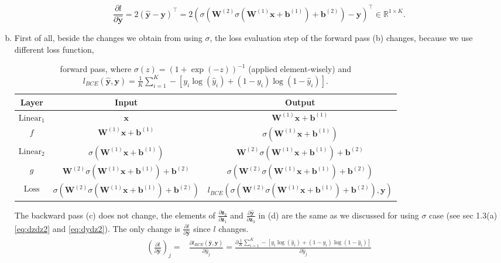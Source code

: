 \documentclass[10pt,a4paper]{article}
\theoremstyle{dotlessP}
\def\RR{\mathbb{R}}
\newcommand{\linear}{\text{Linear}}
\newcommand{\loss}{\text{Loss}}
\newcommand{\dldy}{\frac{\partial l}{\partial \bm{\hat{y}}}}
\newcommand{\dydz}{\frac{\partial \bm{\hat{y}}}{\partial \bm z_3}}
\newcommand{\dzdz}{\frac{\partial \bm z_2}{\partial \bm z_1}}
\newcommand{\yh}{\bm{\hat{y}}}
\begin{document}
\begin{enumerate}[(a)]
\begin{equation}
\dldy = 2(\yh -\bm y)^\top =2 \left(\sigma\left(\bm W^{(2)}\sigma\left(\bm W^{(1)} \bm x+\bm b^{(1)}\right) + \bm b^{(2)}\right)-\bm y\right)^\top\in \RR^{1\times K}.
\end{equation}
\item First of all, beside the changes we obtain from using $\sigma$,  the loss evaluation step of the forward pass (b) changes, because we use different loss function,
	\begin{table}[tbhp] 
	{\footnotesize
		\caption{ forward pass, where $\sigma(z)=(1+\exp(-z))^{-1}$ (applied element-wisely) and $l_{BCE}(\yh, \bm y)=\frac{1}{K}\sum_{i=1}^{K}-[y_i\log(\hat{y}_i)+(1-y_i)\log(1-\hat{y}_i)]$.
		}\label{tab:fw3}
		\begin{center}
			\renewcommand{\arraystretch}{1.5}
			\begin{tabular}{|c|c|c|}
				\hline 
				Layer & Input  & Output \\ 
				\hline 
				$\linear_1$& $\bm x$ & $\bm W^{(1)} \bm x+\bm b^{(1)}$ \\ 
				\hline 
				$f$	&$\bm W^{(1)} \bm x+\bm b^{(1)}$&  $\sigma\left(\bm W^{(1)} \bm x+\bm b^{(1)}\right)$\\ 
				\hline 
				$\linear_2$& $\sigma\left(\bm W^{(1)} \bm x+\bm b^{(1)}\right)$ & $\bm W^{(2)}\sigma\left(\bm W^{(1)} \bm x+\bm b^{(1)}\right) + \bm b^{(2)}$ \\ 
				\hline 
				$g$	& $\bm W^{(2)}\sigma\left(\bm W^{(1)} \bm x+\bm b^{(1)}\right) + \bm b^{(2)}$ &  $\sigma\left(\bm W^{(2)}\sigma\left(\bm W^{(1)} \bm x+\bm b^{(1)}\right) + \bm b^{(2)}\right)$\\ 
				\hline 
				$\loss$	& $\sigma\left(\bm W^{(2)}\sigma\left(\bm W^{(1)} \bm x+\bm b^{(1)}\right) + \bm b^{(2)}\right)$ & $l_{BCE}(\sigma\left(\bm W^{(2)}\sigma\left(\bm W^{(1)} \bm x+\bm b^{(1)}\right) + \bm b^{(2)}\right), \bm y)$ \\ 
				\hline 
			\end{tabular} 
		\end{center}
	}
\end{table}
The backward pass (c) does not change, the elements of $\dzdz$ and $\dydz$ in (d) are the same as we discussed for using $\sigma$ case (see sec 1.3(a) \eqref{eq:dzdz2} and \eqref{eq:dydz2}). The only change is $\dldy$ since $l$ changes.
\begin{equation}
\begin{aligned}
\left(\dldy\right)_j = &\frac{\partial l_{BCE}(\yh,\bm y)}{\partial \hat{y}_j}= \frac{\partial\frac{1}{K}\sum_{i=1}^{K}-[y_i\log(\hat{y}_i)+(1-y_i)\log(1-\hat{y}_i)]}{\partial \hat{y}_j} \\

\end{aligned}
\end{equation}
\end{enumerate}
\end{document}
